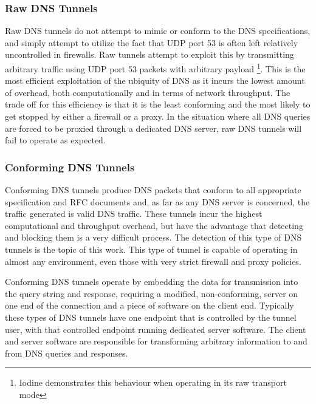 \documentclass{llncs}
\begin{document}
\subsubsection{Raw DNS Tunnels}
\label{tunnels-types-raw}
Raw DNS tunnels do not attempt to mimic or conform to the DNS specifications,
and simply attempt to utilize the fact that UDP port 53 is often left relatively
uncontrolled in firewalls. Raw tunnels attempt to exploit this by transmitting
arbitrary traffic using UDP port 53 packets with arbitrary payload 
\footnote{Iodine demonstrates this behaviour when operating in its raw
transport mode}. This is the most efficient exploitation of the ubiquity of DNS
as it incurs the lowest amount of overhead, both computationally and in terms of
network throughput. The trade off for this efficiency is that it is the least
conforming and the most likely to get stopped by either a firewall or a proxy.
In the situation where all DNS queries are forced to be proxied through a
dedicated DNS server, raw DNS tunnels will fail to operate as expected.

\subsubsection{Conforming DNS Tunnels}
\label{tunnels-types-conforming}
Conforming DNS tunnels produce DNS packets that conform to all appropriate
specification and RFC documents and, as far as any DNS server is concerned, the
traffic generated is valid DNS traffic. These tunnels incur the highest
computational and throughput overhead, but have the advantage that detecting and
blocking them is a very difficult process. The detection of this type of DNS
tunnels is the topic of this work. This type of tunnel is capable of operating
in almost any environment, even those with very strict firewall and proxy policies.

Conforming DNS tunnels operate by embedding the data for transmission into the
query string and response, requiring a modified, non-conforming, server on one
end of the connection and a piece of software on the client end. Typically these
types of DNS tunnels have one endpoint that is controlled by the tunnel user,
with that controlled endpoint running dedicated server software. The client and
server software are responsible for transforming arbitrary information to and
from DNS queries and responses.
\end{document}

